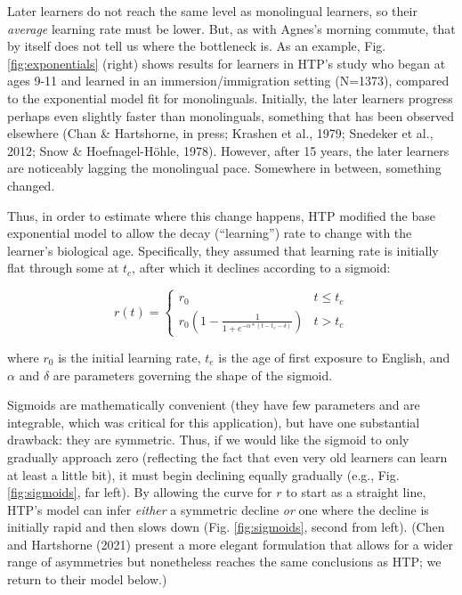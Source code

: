 \documentclass[
  english,
  doc,floatsintext]{apa6}
\begin{document}
Later learners do not reach the same level as monolingual learners, so their \emph{average} learning rate must be lower. But, as with Agnes's morning commute, that by itself does not tell us where the bottleneck is. As an example, Fig. \ref{fig:exponentials} (right) shows results for learners in HTP's study who began at ages 9-11 and learned in an immersion/immigration setting (N=1373), compared to the exponential model fit for monolinguals. Initially, the later learners progress perhaps even slightly faster than monolinguals, something that has been observed elsewhere (Chan \& Hartshorne, in press; Krashen et al., 1979; Snedeker et al., 2012; Snow \& Hoefnagel-Höhle, 1978). However, after 15 years, the later learners are noticeably lagging the monolingual pace. Somewhere in between, something changed.

Thus, in order to estimate where this change happens, HTP modified the base exponential model to allow the decay (``learning'') rate to change with the learner's biological age. Specifically, they assumed that learning rate is initially flat through some at \(t_c\), after which it declines according to a sigmoid:

\[r(t) = \begin{cases} r_0 & t \leq t_c  \\ r_0(1 - \frac{1}{1+e^{-\alpha*(t - t_e - \delta)}}) & t > t_c
    \end{cases}\]

\noindent where \(r_0\) is the initial learning rate, \(t_e\) is the age of first exposure to English, and \(\alpha\) and \(\delta\) are parameters governing the shape of the sigmoid.

Sigmoids are mathematically convenient (they have few parameters and are integrable, which was critical for this application), but have one substantial drawback: they are symmetric. Thus, if we would like the sigmoid to only gradually approach zero (reflecting the fact that even very old learners can learn at least a little bit), it must begin declining equally gradually (e.g., Fig. \ref{fig:sigmoids}, far left). By allowing the curve for \(r\) to start as a straight line, HTP's model can infer \emph{either} a symmetric decline \emph{or} one where the decline is initially rapid and then slows down (Fig. \ref{fig:sigmoids}, second from left). (Chen and Hartshorne (2021) present a more elegant formulation that allows for a wider range of asymmetries but nonetheless reaches the same conclusions as HTP; we return to their model below.)
\end{document}
